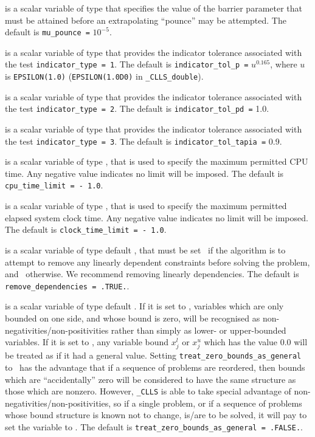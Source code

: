 \documentclass{galahad}
\newcommand{\packagename}{CLLS}
\newcommand{\fullpackagename}{\libraryname\_\packagename}
\begin{document}
\begin{description}
is a scalar variable of type \realdp that specifies
the value of the barrier parameter that must be attained before an 
extrapolating ``pounce'' may be attempted.
The default is {\tt mu\_pounce =} $10^{-5}$.

is a scalar variable of type \realdp that
provides the indicator tolerance associated with the test
{\tt indicator\_type = 1}.
The default is {\tt indicator\_tol\_p =} $u^{0.165}$,
where $u$ is {\tt EPSILON(1.0)} ({\tt EPSILON(1.0D0)} in
{\tt \fullpackagename\_double}).

is a scalar variable of type \realdp that
provides the indicator tolerance associated with the test
{\tt indicator\_type = 2}.
The default is {\tt indicator\_tol\_pd =} 1.0.

is a scalar variable of type \realdp that
provides the indicator tolerance associated with the test
{\tt indicator\_type = 3}.
The default is {\tt indicator\_tol\-\_tapia =} 0.9.

 is a scalar variable of type \realdp,
that is used to specify the maximum permitted CPU time. Any negative
value indicates no limit will be imposed. The default is
{\tt cpu\_time\_limit = - 1.0}.

 is a scalar variable of type \realdp,
that is used to specify the maximum permitted elapsed system clock time.
Any negative value indicates no limit will be imposed. The default is
{\tt clock\_time\_limit = - 1.0}.

 is a scalar variable of type
default \logical, that must be set \true\ if the algorithm
is to attempt to remove any linearly dependent constraints before
solving the problem, and \false\ otherwise.
We recommend removing linearly dependencies.
The default is {\tt remove\_dependencies = .TRUE.}.

 is a scalar variable of type
default \logical.
If it is set to \false, variables which
are only bounded on one side, and whose bound is zero,
will be recognised as non-negativities/non-positivities rather than simply as
lower- or upper-bounded variables.
If it is set to \true, any variable bound
$x_{j}^{l}$ or $x_{j}^{u}$ which has the value 0.0 will be
treated as if it had a general value.
Setting {\tt treat\_zero\_bounds\_as\_general} to \true\ has the advantage
that if a sequence of problems are reordered, then bounds which are
``accidentally'' zero will be considered to have the same structure as
those which are nonzero. However, {\tt \fullpackagename} is
able to take special advantage of non-negativities/non-positivities, so
if a single problem, or if a sequence of problems whose
bound structure is known not to change, is/are to be solved,
it will pay to set the variable to \false.
The default is {\tt treat\_zero\_bounds\_as\_general = .FALSE.}.


\end{description}
\end{document}
